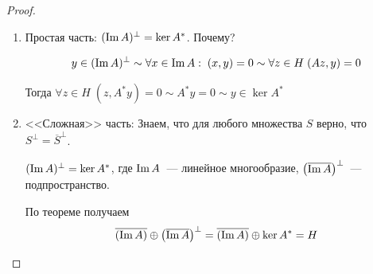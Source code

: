 \begin{proof}
    \begin{enumerate}
        \item Простая часть: $(\operatorname{Im} A)^\perp = \ker A^*$. Почему?

        \[ y \in (\operatorname{Im} A)^\perp \sim \forall x \in \operatorname{Im} A: \; (x,y)=0 \sim \forall z \in H \; (Az, y)=0\]

        Тогда $\forall z \in H \; (z, A^*y)=0 \sim A^*y=0 \sim y \in \ker A^*$
        \item <<Сложная>> часть:
        Знаем, что для любого множества $S$ верно, что $S^{\perp} = \overline{S}^{\perp}$.

        $(\operatorname{Im} A)^{\perp} = \ker A^*$, где $\operatorname{Im} A$~--- линейное многообразие,
        $\left( \overline{\operatorname{Im} A} \right)^{\perp}$~--- подпространство.

        По теореме  получаем 
        \[ \overline{(\operatorname{Im} A)} \oplus \left( \overline{\operatorname{Im} A} \right)^{\perp}=\overline{(\operatorname{Im} A)} \oplus \ker A^* = H \]
    \end{enumerate}
\end{proof}
